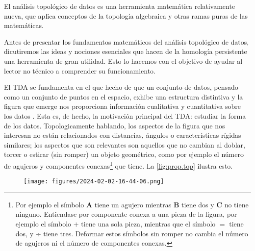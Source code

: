 \documentclass[a4paper,11pt]{article}
\begin{document}
El análisis topológico de  datos es una herramienta matemática relativamente nueva, que aplica conceptos de la topología algebraica y otras ramas puras de las matemáticas.

Antes de presentar los fundamentos matemáticos del análisis topológico de datos, dicutiremos las ideas y nociones esenciales que hacen de la homología persistente una herramienta de gran utilidad. Esto lo hacemos con el objetivo de  ayudar al lector no técnico a comprender su funcionamiento.

El TDA se fundamenta en el que hecho de que un conjunto de datos, pensado como un conjunto de puntos en el espacio, exhibe una estructura distintiva y  la figura que emerge  nos proporciona información cualitativa y cuantitativa sobre los datos \cite{chazal21}.
Esta es, de hecho, la motivación principal del TDA:  estudiar la forma de los datos.
Topologicamente hablando, los aspectos de la figura que nos interesan no están relacionados con distancias, ángulos  o características rígidas similares; los aspectos que son relevantes son aquellos que no cambian al doblar, torcer o estirar (sin romper) un objeto geométrico, como por ejemplo el número de agujeros y componentes conexas\footnote{Por ejemplo el símbolo \(\mathbf{A}\) tiene un agujero mientras \(\mathbf{B}\) tiene dos y \(\mathbf{C}\) no tiene ninguno. Entiendase por componente conexa a una pieza de la figura, por ejemplo el símbolo \(+\) tiene una sola pieza, mientras que el símbolo \(=\) tiene dos, y \(\div\) tiene tres. Deformar estos símbolos sin romper no cambia el número de agujeros ni el número de componentes conexas.} que tiene. La \autoref{fig:prop.top} ilustra esto.

\begin{figure}[!htb]
    \centering
    \texttt{[image: figures/2024-02-02-16-44-06.png]}
    \caption{}\label{fig:prop.top}
\end{figure}
\end{document}
